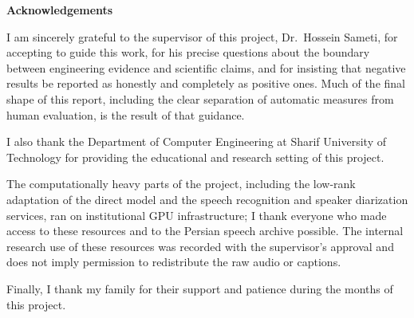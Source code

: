 
\begin{center}
\textbf{Acknowledgements}
\end{center}
\noindent

I am sincerely grateful to the supervisor of this project, Dr.\ Hossein Sameti,
for accepting to guide this work, for his precise questions about the boundary
between engineering evidence and scientific claims, and for insisting that
negative results be reported as honestly and completely as positive ones. Much
of the final shape of this report, including the clear separation of automatic
measures from human evaluation, is the result of that guidance.

I also thank the Department of Computer Engineering at Sharif University of
Technology for providing the educational and research setting of this project.

The computationally heavy parts of the project, including the low-rank
adaptation of the direct model and the speech recognition and speaker
diarization services, ran on institutional GPU infrastructure; I thank everyone
who made access to these resources and to the Persian speech archive possible.
The internal research use of these resources was recorded with the
supervisor's approval and does not imply permission to redistribute the raw
audio or captions.

Finally, I thank my family for their support and patience during the months of
this project.

\newpage
